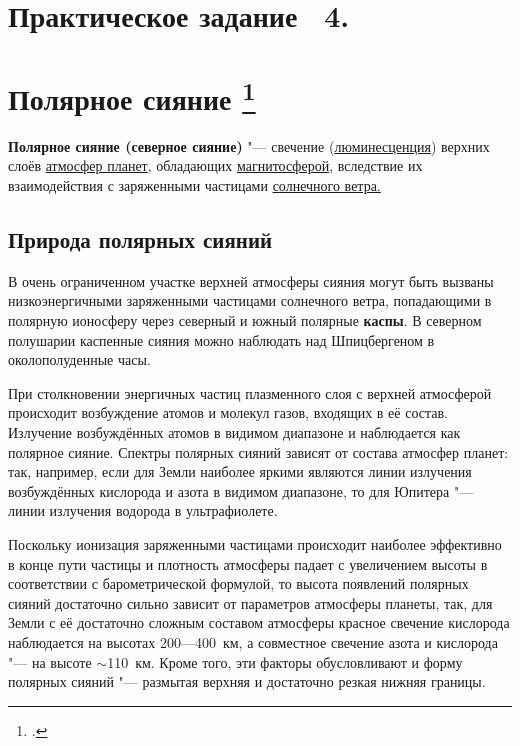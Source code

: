 \documentclass[a4paper,14pt]{article}
\begin{document}
 
	
	
	\section*{Практическое задание \textnumero~4.}
	
	\section*{Полярное сияние \footcite{wiki}}
	
	\textbf{Полярное сияние (северное сияние)} "--- свечение (\href{https://ru.wikipedia.org/wiki/%D0%9B%D1%8E%D0%BC%D0%B8%D0%BD%D0%B5%D1%81%D1%86%D0%B5%D0%BD%D1%86%D0%B8%D1%8F}{люминесценция})
		верхних слоёв \href{https://ru.wikipedia.org/wiki/%D0%90%D1%82%D0%BC%D0%BE%D1%81%D1%84%D0%B5%D1%80%D0%B0}{атмосфер планет}, обладающих \href{https://ru.wikipedia.org/wiki/%D0%9C%D0%B0%D0%B3%D0%BD%D0%B8%D1%82%D0%BE%D1%81%D1%84%D0%B5%D1%80%D0%B0}{магнитосферой}, вследствие
			их взаимодействия с заряженными частицами \href{https://ru.wikipedia.org/wiki/%D0%A1%D0%BE%D0%BB%D0%BD%D0%B5%D1%87%D0%BD%D1%8B%D0%B9_%D0%B2%D0%B5%D1%82%D0%B5%D1%80}{солнечного ветра.}
				
				\tableofcontents
				
				\subsection*{Природа полярных сияний}
				
				В очень ограниченном участке верхней атмосферы сияния могут быть вызваны низкоэнергичными заряженными частицами солнечного ветра, попадающими в полярную ионосферу через северный и южный полярные \textbf{каспы}. В северном полушарии каспенные сияния можно наблюдать над Шпицбергеном в околополуденные часы.
				
				При столкновении энергичных частиц плазменного слоя с верхней атмосферой происходит возбуждение атомов и молекул газов, входящих в её состав. Излучение возбуждённых атомов в видимом диапазоне и наблюдается как полярное сияние. Спектры полярных сияний зависят от состава атмосфер планет: так, например, если для Земли наиболее яркими являются линии излучения возбуждённых кислорода и азота в видимом диапазоне, то для Юпитера "--- линии излучения водорода в ультрафиолете.
				
				Поскольку ионизация заряженными частицами происходит наиболее эффективно в конце пути частицы и плотность атмосферы падает с увеличением высоты в соответствии с барометрической формулой, то высота появлений полярных сияний достаточно сильно зависит от параметров атмосферы планеты, так, для Земли с её достаточно сложным составом атмосферы красное свечение кислорода наблюдается на высотах 200---400~км, а совместное свечение азота и кислорода "--- на высоте $\sim$110~км. Кроме того, эти факторы обусловливают и форму полярных сияний "--- размытая верхняя и достаточно резкая нижняя границы.
				
\end{document}
